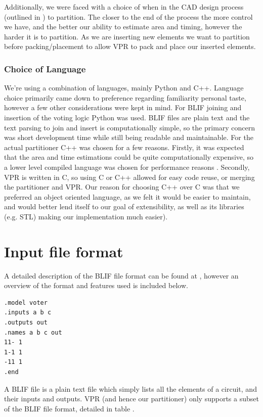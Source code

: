\documentclass[12pt,drafta4paper,oneside]{memoir} %
\begin{document}
Additionally, we were faced with a choice of when in the \ac{CAD} design process (outlined in ) to partition. The closer to the end of the process the more control we have, and the better our ability to estimate area and timing, however the harder it is to partition. As we are inserting new elements we want to partition before packing/placement to allow \ac{VPR} to pack and place our inserted elements.

\subsubsection{Choice of Language}
We're using a combination of languages, mainly Python and C++. Language choice primarily came down to preference regarding familiarity personal taste, however a few other considerations were kept in mind.
For \ac{BLIF} joining and insertion of the voting logic Python was used. \ac{BLIF} files are plain text and the text parsing to join and insert is computationally simple, so the primary concern was short development time while still being readable and maintainable.
For the actual partitioner C++ was chosen for a few reasons. Firstly, it was expected that the area and time estimations could be quite computationally expensive, so a lower level compiled language was chosen for performance reasons . Secondly, \ac{VPR} is written in C, so using C or C++ allowed for easy code reuse, or merging the partitioner and \ac{VPR}. Our reason for choosing C++ over C was that we preferred an object oriented language, as we felt it would be easier to maintain, and would better lend itself to our goal of extensibility, as well as its libraries (e.g. \ac{STL}) making our implementation much easier).

\section{Input file format}
A detailed description of the \ac{BLIF} file format can be found at , however an overview of the format and features used is included below.
\begin{lstlisting}[caption=Sample BLIF file, label=SampleBlif]
.model voter
.inputs a b c
.outputs out
.names a b c out
11- 1
1-1 1
-11 1
.end
\end{lstlisting}
A \ac{BLIF} file is a plain text file which simply lists all the elements of a circuit, and their inputs and outputs. \ac{VPR} (and hence our partitioner) only supports a subset of the \ac{BLIF} file format, detailed in table .
\end{document}
